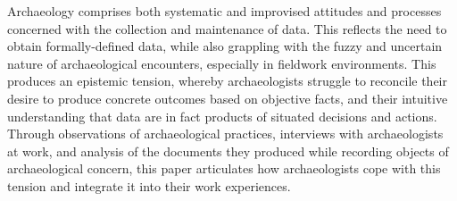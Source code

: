 Archaeology comprises both systematic and improvised attitudes and processes concerned with the collection and maintenance of data.
This reflects the need to obtain formally-defined data, while also grappling with the fuzzy and uncertain nature of archaeological encounters, especially in fieldwork environments.
This produces an epistemic tension, whereby archaeologists struggle to reconcile their desire to produce concrete outcomes based on objective facts, and their intuitive understanding that data are in fact products of situated decisions and actions.
Through observations of archaeological practices, interviews with archaeologists at work, and analysis of the documents they produced while recording objects of archaeological concern, this paper articulates how archaeologists cope with this tension and integrate it into their work experiences.

